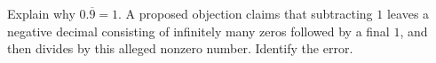 Explain why $0.\overline9=1$. A proposed objection claims that subtracting $1$ leaves a negative decimal consisting of infinitely many zeros followed by a final $1$, and then divides by this alleged nonzero number. Identify the error.
